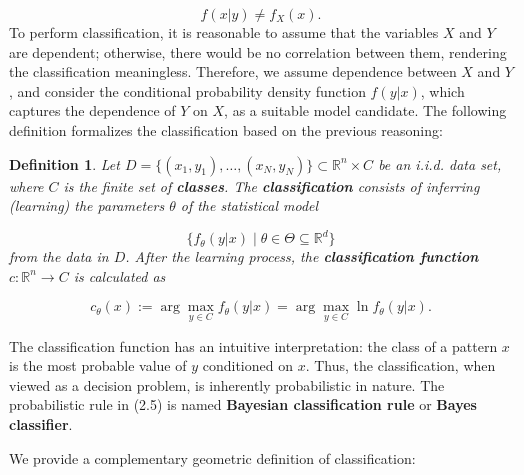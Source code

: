 \documentclass{report}
\newtheorem{definition}{Definition}[chapter]
\begin{document}
\begin{equation}
f(x|y) \neq f_X(x).
\end{equation}
To perform classification, it is reasonable to assume that the variables $X$ and $Y$ are dependent; otherwise, there would be no correlation between them, rendering the classification meaningless. Therefore, we assume dependence between $X$ and $Y$, and consider the conditional probability density function $f(y|x)$, which captures the dependence of $Y$ on $X$, as a suitable model candidate. The following definition formalizes the classification based on the previous reasoning:

\begin{definition}
Let $D = \{(x_1,y_1),\dots,(x_N,y_N)\} \subset \mathbb{R}^n \times C$ be an i.i.d. data set, where $C$ is the finite set of \textbf{classes}. The \textbf{classification} consists of inferring (learning) the parameters $\theta$ of the statistical model

\begin{equation}
\{f_\theta(y|x) \mid \theta \in \Theta \subseteq \mathbb{R}^d\}
\end{equation}
from the data in $D$. After the learning process, the \textbf{classification function} $c : \mathbb{R}^n \to C$ is calculated as

\begin{equation}
c_\theta(x) := \arg \max_{y \in C} f_\theta(y|x) = \arg \max_{y \in C} \ln f_\theta(y|x).
\end{equation}
\end{definition}
The classification function has an intuitive interpretation: the class of a pattern $x$ is the most probable value of $y$ conditioned on $x$. Thus, the classification, when viewed as a decision problem, is inherently probabilistic in nature. The probabilistic rule in (2.5) is named \textbf{Bayesian classification rule} or \textbf{Bayes classifier}.

We provide a complementary geometric definition of classification:
\end{document}
